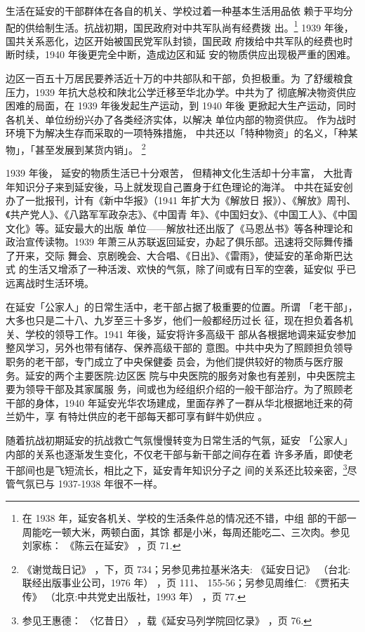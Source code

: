 生活在延安的干部群体在各自的机关、学校过着一种基本生活用品依
赖于平均分配的供给制生活。抗战初期，国民政府对中共军队尚有经费拨
出。\footnote{在 1938 年，延安各机关、学校的生活条件总的情况还不错，中组
部的干部一周能吃一顿大米，两顿白面，其馀
都是小米，每周还能吃二、三次肉。参见刘家栋：
《陈云在延安》
，页 71. 
}
1939 年後，国共关系恶化，边区开始被国民党军队封锁，国民政
府拨给中共军队的经费也时断时续，1940 年後更完全中断，造成边区和延
安的物质供应出现极严重的困难。

边区一百五十万居民要养活近十万的中共部队和干部，负担极重。为
了舒缓粮食压力，1939 年抗大总校和陕北公学迁移至华北办学。中共为了
彻底解决物资供应困难的局面，在 1939 年後发起生产运动，到 1940 年後
更掀起大生产运动，同时各机关、单位纷纷兴办了各类经济实体，以解决
单位内部的物资供应。
作为战时环境下为解决生存而采取的一项特殊措施，
中共还以「特种物资」的名义，「种某物」，「甚至发展到某货内销」。
\footnote{《谢觉哉日记》
，下，页 734；另参见弗拉基米洛夫:
《延安日记》
（台北:联经出版事业公司，1976 年）
，页 111、
155-56；另参见周维仁:
《贾拓夫传》
（北京:中共党史出版社，1993 年）
，页 77. 
}

1939 年後，
延安的物质生活已十分艰苦，
但精神文化生活却十分丰富，
大批青年知识分子来到延安後，马上就发现自己置身于红色理论的海洋。
中共在延安创办了一批报刊，计有《新中华报》（1941 年扩大为《解放日
报》）、《解放》周刊、《共产党人》、《八路军军政杂志》、《中国青
年》、《中国妇女》、《中国工人》、《中国文化》等。延安最大的出版
单位——解放社还出版了《马恩丛书》等各种理论和政治宣传读物。1939
年萧三从苏联返回延安，办起了俱乐部。迅速将交际舞传播了开来，交际
舞会、京剧晚会、大合唱、《日出》、《雷雨》，使延安的革命斯巴达式
的生活又增添了一种活泼、欢快的气氛，除了间或有日军的空袭，延安似
乎已远离战时生活环境。

在延安「公家人」的日常生活中，老干部占据了极重要的位置。所谓
「老干部」，大多也只是二十八、九岁至三十多岁，他们一般都经历过长
征，现在担负着各机关、学校的领导工作。1941 年後，延安将许多高级干
部从各根据地调来延安参加整风学习，另外也带有储存、保养高级干部的
意图。中共中央为了照顾担负领导职务的老干部，专门成立了中央保健委
员会，为他们提供较好的物质与医疗服务。延安的两个主要医院:边区医
院与中央医院的服务对象也有差别，中央医院主要为领导干部及其家属服
务，间或也为经组织介绍的一般干部治疗。为了照顾老干部的身体，1940
年延安光华农场建成，里面存养了一群从华北根据地迁来的荷兰奶牛，享
有特灶供应的老干部每天都可享有鲜牛奶供应
。

随着抗战初期延安的抗战救亡气氛慢慢转变为日常生活的气氛，延安
「公家人」内部的关系也逐渐发生变化，不仅老干部与新干部之间存在着
许多矛盾，即使老干部间也是飞短流长，相比之下，延安青年知识分子之
间的关系还比较亲密，\footnote{参见王惠德：
〈忆昔日〉
，载《延安马列学院回忆录》
，页 76. }尽管气氛已与 1937-1938 年很不一样。


